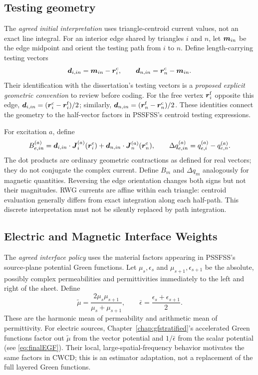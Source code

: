 \subsection{Testing geometry}
The \emph{agreed initial interpretation} uses triangle-centroid current values,
not an exact line integral. For an interior edge shared by triangles $i$ and $n$,
let $\boldsymbol{m}_{in}$ be the edge midpoint and orient the testing path from $i$
to $n$. Define length-carrying testing vectors
\begin{equation}
  \boldsymbol{d}_{i,in}= \boldsymbol{m}_{in} - \boldsymbol{r}^{\text{c}}_i,
  \qquad
 \boldsymbol{d}_{n,in} = \boldsymbol{r}^{\text{c}}_n - \boldsymbol{m}_{in}.
 \label{eq:amr-test-vectors}
\end{equation}
Their identification with the dissertation's \cite{kim2017error}
testing vectors is a
\emph{proposed explicit geometric convention} to review before coding.
For the free vertex $\boldsymbol{r}^{\text{f}}_{i}$ opposite this edge,
$\boldsymbol{d}_{i,in} = (\boldsymbol{r}^{\text{c}}_i - \boldsymbol{r}^{\text{f}}_{i})/2$; similarly,
$\boldsymbol{d}_{n,in} = (\boldsymbol{r}^{\text{f}}_{n} - \boldsymbol{r}^{\text{c}}_n)/2$.
These identities connect the geometry to the half-vector factors in PSSFSS's
centroid testing expressions.

For excitation $a$, define
\begin{equation}
 B_{e,in}^{(a)} =
 \boldsymbol{d}_{i,in} \cdot \boldsymbol{J}_i^{(a)}(\boldsymbol{r}^{\text{c}}_i) + \boldsymbol{d}_{n,in} \cdot \boldsymbol{J}_n^{(a)}(\boldsymbol{r}^{\text{c}}_n),
 \qquad
 \Delta q_{e,in}^{(a)} = q_{e,i}^{(a)} - q_{e,n}^{(a)}.
 \label{eq:amr-centroid-test}
\end{equation}
The dot products are ordinary geometric contractions as defined for real vectors; they do
not conjugate the complex current. Define $B_m$ and $\Delta q_m$ analogously for magnetic quantities.
Reversing the edge orientation changes both signs but not their magnitudes.
RWG currents are affine within each triangle: centroid evaluation generally
differs from exact integration along each half-path. This discrete interpretation
must not be silently replaced by path integration.

\subsection{Electric and Magnetic Interface Weights}
The \emph{agreed interface policy} uses the material factors appearing in
PSSFSS's source-plane potential Green functions. Let $\mu_s,\epsilon_s$ and
$\mu_{s+1}, \epsilon_{s+1}$ be the absolute, possibly complex permeabilities and permittivities
immediately to the left and right of the sheet. Define
\begin{equation}
  \tilde{\mu} = \frac{2 \mu_s \mu_{s+1}}{\mu_s + \mu_{s+1}},
  \qquad
  \bar{\epsilon} = \frac{\epsilon_s + \epsilon_{s+1}}{2}.
 \label{eq:amr-interface-materials}
\end{equation}
These are the harmonic mean of permeability and arithmetic mean of permittivity.
For electric sources, Chapter~\ref{chap:gfstratified}'s accelerated Green functions factor out
$\tilde{\mu}$ from the vector potential and $1/\bar{\epsilon}$ from
the scalar potential (see \eqref{eq:finalEGF}).
Their local, large-spatial-frequency behavior motivates the same factors in
CWCD; this is an estimator adaptation, not a replacement of the full layered
Green functions.

